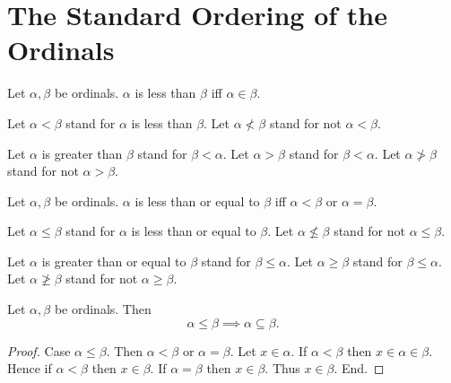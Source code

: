\documentclass[10pt]{article}
\begin{document}
  \section{The Standard Ordering of the Ordinals}

  \begin{forthel}
    \begin{definition}
      Let $\alpha, \beta$ be ordinals.
      $\alpha$ is less than $\beta$ iff $\alpha \in \beta$.
    \end{definition}

    Let $\alpha < \beta$ stand for $\alpha$ is less than $\beta$.
    Let $\alpha \nless \beta$ stand for not $\alpha < \beta$.

    Let $\alpha$ is greater than $\beta$ stand for $\beta < \alpha$.
    Let $\alpha > \beta$ stand for $\beta < \alpha$.
    Let $\alpha \ngtr \beta$ stand for not $\alpha > \beta$.
  \end{forthel}

  \begin{forthel}
    \begin{definition}
      Let $\alpha, \beta$ be ordinals.
      $\alpha$ is less than or equal to $\beta$ iff $\alpha < \beta$ or
      $\alpha = \beta$.
    \end{definition}

    Let $\alpha \leq \beta$ stand for $\alpha$ is less than or equal to $\beta$.
    Let $\alpha \nleq \beta$ stand for not $\alpha \leq \beta$.

    Let $\alpha$ is greater than or equal to $\beta$ stand for
    $\beta \leq \alpha$.
    Let $\alpha \geq \beta$ stand for $\beta \leq \alpha$.
    Let $\alpha \ngeq \beta$ stand for not $\alpha \geq \beta$.
  \end{forthel}

  \begin{forthel}
    \begin{proposition}
      Let $\alpha, \beta$ be ordinals.
      Then \[ \alpha \leq \beta \implies \alpha \subseteq \beta. \]
    \end{proposition}
    \begin{proof}
      Case $\alpha \leq \beta$.
        Then $\alpha < \beta$ or $\alpha = \beta$.
        Let $x \in \alpha$.
        If $\alpha < \beta$ then $x \in \alpha \in \beta$.
        Hence if $\alpha < \beta$ then $x \in \beta$.
        If $\alpha = \beta$ then $x \in \beta$.
        Thus $x \in \beta$.
      End.
    \end{proof}
  \end{forthel}
\end{document}
